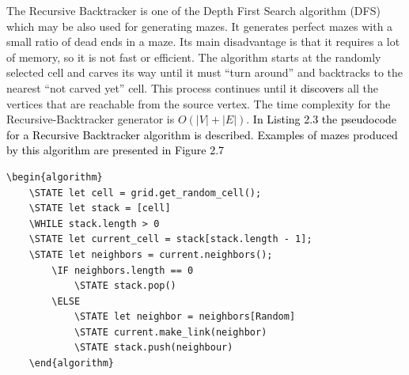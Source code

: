 The Recursive Backtracker is one of the Depth First Search algorithm (DFS) which may be also used for generating mazes. It generates perfect mazes with a small ratio of dead ends in a maze. Its main disadvantage is that it requires a lot of memory, so it is not fast or efficient\cite{Puntambekar}. The algorithm starts at the randomly selected cell and carves its way until it must “turn around” and backtracks to the nearest “not carved yet” cell. This process continues until \textcolor{black}{it discovers} all the vertices that are reachable from the source vertex. The time complexity for the Recursive-Backtracker generator is $O(|V|+|E|)$. \textcolor{black}{In Listing 2.3 the pseudocode for a Recursive Backtracker algorithm is described. Examples of mazes produced by this algorithm are presented in Figure 2.7}

\begin{lstlisting}[caption={Pseudocode for a Recursive-Backtracker algorithm}]
	\begin{algorithm}
	\STATE let cell = grid.get_random_cell();
	\STATE let stack = [cell]
	\WHILE stack.length > 0
	\STATE let current_cell = stack[stack.length - 1];
	\STATE let neighbors = current.neighbors();
		\IF neighbors.length == 0
			\STATE stack.pop()
		\ELSE 
			\STATE let neighbor = neighbors[Random]
			\STATE current.make_link(neighbor)
			\STATE stack.push(neighbour)	
	\end{algorithm}
	\end{lstlisting}
\newline
